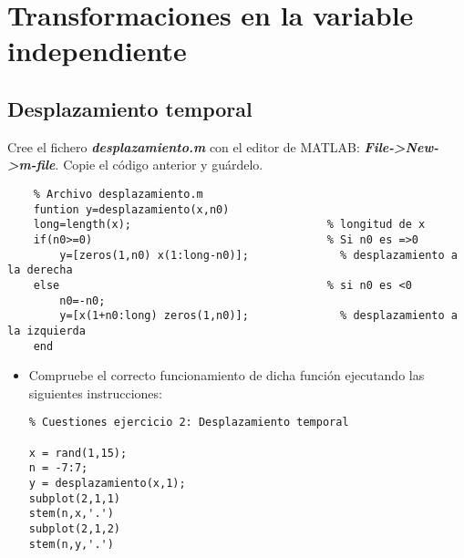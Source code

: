 \documentclass{article}
\begin{document}
\section{Transformaciones en la variable independiente}
\subsection{Desplazamiento temporal}

Cree el fichero \textbf{\textit{desplazamiento.m}} con el editor de MATLAB: \textbf{\textit{File->New->m-file}}. Copie el código anterior y guárdelo.

\begin{lstlisting}
	% Archivo desplazamiento.m
	funtion y=desplazamiento(x,n0)
	long=length(x);                              % longitud de x
	if(n0>=0)                                    % Si n0 es =>0
		y=[zeros(1,n0) x(1:long-n0)];              % desplazamiento a la derecha
	else                                         % si n0 es <0
		n0=-n0;
		y=[x(1+n0:long) zeros(1,n0)];              % desplazamiento a la izquierda
	end
\end{lstlisting}
\begin{itemize}[label=$-$]
	\item Compruebe el correcto funcionamiento de dicha función ejecutando las siguientes instrucciones:
	
	\begin{lstlisting}
% Cuestiones ejercicio 2: Desplazamiento temporal

x = rand(1,15);
n = -7:7;
y = desplazamiento(x,1);
subplot(2,1,1)
stem(n,x,'.')
subplot(2,1,2)
stem(n,y,'.')
	\end{lstlisting}
\end{itemize}
\end{document}
